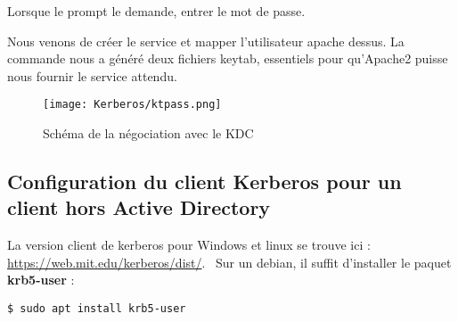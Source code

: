 Lorsque le prompt le demande, entrer le mot de passe.

\pagebreak
 Nous venons de créer le service et mapper l'utilisateur apache dessus. La commande nous a généré deux fichiers keytab, essentiels pour qu'Apache2 puisse nous fournir le service attendu.   
  \begin{figure}[h!]
     \begin{center}
         \texttt{[image: Kerberos/ktpass.png]}
         \caption{Schéma de la négociation avec le KDC}
         \label{Debian_screenshots/Config/5}
     \end{center}
  \end{figure}
  \FloatBarrier

\subsection{Configuration du client Kerberos pour un client hors Active Directory}
La version client de kerberos pour Windows et linux se trouve ici : \url{https://web.mit.edu/kerberos/dist/}. \
Sur un debian, il suffit d'installer le paquet \textbf{krb5-user} : 
\begin{verbatim}
$ sudo apt install krb5-user
\end{verbatim}

